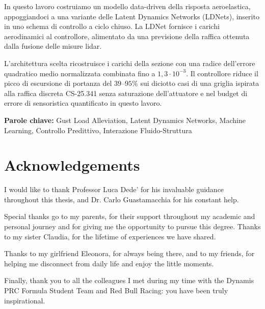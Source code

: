 \documentclass[11pt,a4paper]{article}
\begin{document}
In questo lavoro costruiamo un modello data-driven della risposta aeroelastica,
appoggiandoci a una variante delle Latent Dynamics Networks (LDNets), inserito
in uno schema di controllo a ciclo chiuso. La LDNet fornisce i carichi aerodinamici al controllore, alimentato da una previsione della raffica ottenuta dalla fusione delle misure lidar.

L'architettura scelta ricostruisce i carichi della sezione con una radice
dell'errore quadratico medio normalizzata combinata fino a $1{,}3\cdot10^{-3}$. Il controllore
riduce il picco di escursione di portanza del $39$--$95\%$ sui diciotto casi
di una griglia ispirata alla raffica discreta CS-25.341 senza saturazione dell'attuatore e nel budget di
errore di sensoristica quantificato in questo lavoro.
\vspace{15pt}
\begin{tcolorbox}[arc=0pt, boxrule=0pt, colback=bluePoli!60, width=\textwidth, colupper=white]
    \textbf{Parole chiave:} Gust Load Alleviation, Latent Dynamics Networks, Machine Learning, Controllo Predittivo, Interazione Fluido-Struttura
\end{tcolorbox}

\section*{Acknowledgements}

I would like to thank Professor Luca Dede' for his invaluable guidance throughout this thesis, and Dr. Carlo Guastamacchia for his constant help.

Special thanks go to my parents, for their support throughout my academic and personal journey and for giving me the opportunity to pursue this degree. Thanks to my sister Claudia, for the lifetime of experiences we have shared.

Thanks to my girlfriend Eleonora, for always being there, and to my friends, for helping me disconnect from daily life and enjoy the little moments.

Finally, thank you to all the colleagues I met during my time with the Dynamis PRC Formula Student Team and Red Bull Racing: you have been truly inspirational.

\end{document}
